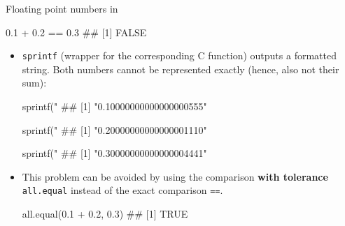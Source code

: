 \begin{vbframe}{Floating point numbers in }
\footnotesize
\begin{verbbox}
0.1 + 0.2 == 0.3
## [1] FALSE
\end{verbbox}
\col
\vspace{0.3cm}
\normalsize
\begin{itemize}
\item \texttt{sprintf} (wrapper for the corresponding C function) outputs a formatted string. Both numbers cannot be represented exactly (hence, also not their sum):
\footnotesize
\vspace{0.2cm}
\begin{verbbox}
sprintf("%
## [1] "0.10000000000000000555"
\end{verbbox}
\col
\vspace{0.2cm}
\begin{verbbox}
sprintf("%
## [1] "0.20000000000000001110"
\end{verbbox}
\col
\vspace{0.2cm}
\begin{verbbox}
sprintf("%
## [1] "0.30000000000000004441"
\end{verbbox}
\col
\vspace{0.3cm}
\normalsize
\item This problem can be avoided by using the comparison \textbf{with tolerance} \texttt{all.equal} instead of the exact comparison \texttt{==}.
\footnotesize
\vspace{0.2cm}
\begin{verbbox}
all.equal(0.1 + 0.2, 0.3)
## [1] TRUE
\end{verbbox}
\col

\end{itemize}
\normalsize
\end{vbframe}





